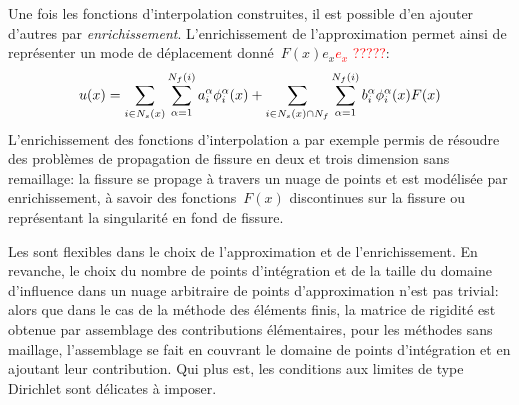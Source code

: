 \medskip
Une fois les fonctions d'interpolation construites, il est possible d'en ajouter d'autres par \emph{enrichissement}. L'enrichissement de l'approximation permet ainsi de représenter un mode de déplacement donné~$F(x)e_x$\textcolor{red}{$e_x$ ?????}:
\begin{equation}
u(x) = \displaystyle\sum_{i\in N_s(x)}\displaystyle\sum_{\alpha=1}^{N_f(i)} a_i^\alpha \phi_i^\alpha(x) + \displaystyle\sum_{i\in N_s(x)\cap N_f}\displaystyle\sum_{\alpha=1}^{N_f(i)} b_i^\alpha\phi_i^\alpha(x)F(x)
\end{equation}
L'enrichissement des fonctions d'interpolation a par exemple permis de résoudre des problèmes de propagation de fissure en deux et trois dimension sans remaillage: la fissure se propage à travers un nuage de points et est modélisée par enrichissement, à savoir des fonctions~$F(x)$ discontinues sur la fissure ou représentant la singularité en fond de fissure.

\medskip
Les  sont flexibles dans le choix de l'approximation et de l'enrichissement. En revanche, le choix du nombre de points d'intégration et de la taille du domaine d'influence dans un nuage arbitraire de points d'approximation n'est pas trivial: alors que dans le cas de la méthode des éléments finis, la matrice de rigidité est obtenue par assemblage des contributions élémentaires, pour les méthodes sans maillage, l'assemblage se fait en couvrant le domaine de points d'intégration et en ajoutant leur contribution. Qui plus est, les conditions aux limites de type Dirichlet sont délicates à imposer.



\medskip
